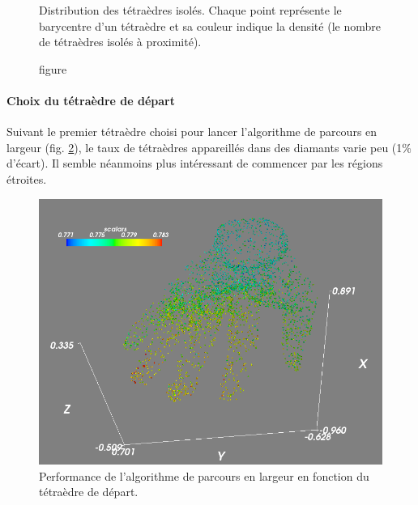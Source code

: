 \documentclass[a4paper,11pt,openany]{article}
\begin{document}
\begin{figure}[H]
\begin{minipage}{.5\textwidth}
  \caption{figure}{Distribution des tétraèdres isolés. Chaque point représente le barycentre d'un tétraèdre et sa couleur indique la densité (le nombre de tétraèdres isolés à proximité).}
  \label{fig:hand_density}
\end{minipage}
\end{figure}

\paragraph{Choix du tétraèdre de départ}
Suivant le premier tétraèdre choisi pour lancer l'algorithme de parcours en largeur (fig. \ref{fig:bfs_starting}), le taux de tétraèdres appareillés dans des diamants varie peu (1\% d'écart). Il semble néanmoins plus intéressant de commencer par les régions étroites.
\begin{figure}[H]
\begin{center}
\includegraphics[scale=0.3]{Images/bfs_starting}
\caption{Performance de l'algorithme de parcours en largeur en fonction du tétraèdre de départ.}
\label{fig:bfs_starting}
\end{center}
\end{figure}
\noindent

\end{document}
